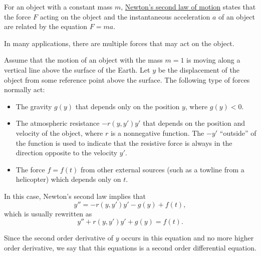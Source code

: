 \begin{example}
  For an object with a constant mass $m$, \href{https://phys.libretexts.org/Bookshelves/College_Physics/Book\%3A_College_Physics_(OpenStax)/04\%3A_Dynamics-_Force_and_Newton's_Laws_of_Motion/4.03\%3A_Newtons_Second_Law_of_Motion-_Concept_of_a_System}{Newton’s second law of motion} states that the force $F$ acting on the object and the instantaneous acceleration $a$ of an object are related by the equation $F = ma$.

  In many applications, there are multiple forces that may act on the object.

  Assume that the motion of an object with the mass $m=1$ is moving along a vertical line above the surface of the Earth. Let $y$ be the displacement of the object from some reference point above the surface. The following type of forces normally act:
  \begin{itemize}
    \item The gravity $g(y)$ that depends only on the position $y$, where $g(y) < 0$.
    \item The atmospheric resistance $-r(y,y')y'$ that depends on the position and velocity of the object, where $r$ is a nonnegative function. The $-y'$ “outside” of the function is used to indicate that the resistive force is always in the direction opposite to the velocity $y'$.
    \item The force $f = f(t)$ from other external sources (such as a towline from a helicopter) which depends only on $t$.
  \end{itemize}

  In this case, Newton’s second law implies that
  $$y'' = -r(y,y')y' - g(y) + f(t),$$
  which is usually rewritten as
  $$y'' + r(y,y')y' + g(y) = f(t).$$

  Since the second order derivative of $y$ occurs in this equation and no more higher order derivative, we say that this equations is a second order differential equation.
\end{example}

